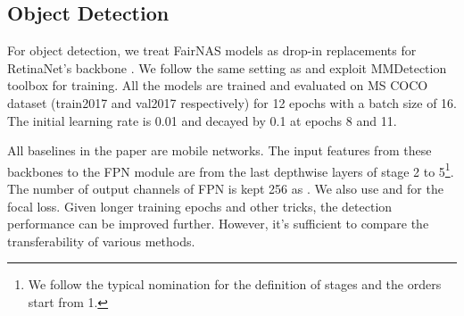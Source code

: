 \documentclass[10pt,twocolumn,letterpaper]{article}
\theoremstyle{definition}
\begin{document}
\subsection{Object Detection}


For object detection, we treat FairNAS models as drop-in replacements for RetinaNet's backbone \cite{lin2017focal}. We follow the same setting as \cite{lin2017focal} and exploit MMDetection toolbox \cite{chen2019mmdetection} for training. All the models are trained and evaluated on MS COCO dataset (train2017 and val2017 respectively) \cite{lin2014coco} for 12 epochs with a batch size of 16. The initial learning rate is 0.01 and decayed by 0.1 at epochs 8 and 11.   



All baselines in the paper are mobile networks. The input features from these backbones to the FPN module  are from the last depthwise layers of stage 2 to 5\footnote{We follow the typical nomination for the definition of stages and the orders start from 1.}.  The number of  output channels of FPN is kept 256 as \cite{lin2017focal}. We also use  and  for the focal loss. Given longer training epochs and other tricks, the detection performance can be improved further. However, it's sufficient to compare the transferability of various methods.
\end{document}
